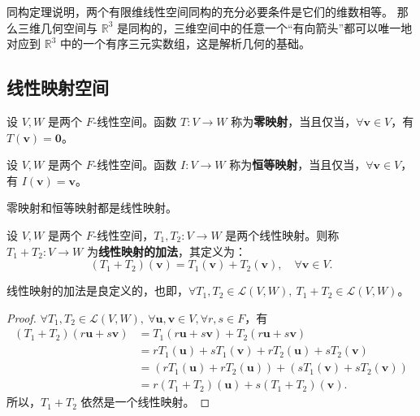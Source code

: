 \begin{note}
    同构定理说明，两个有限维线性空间同构的充分必要条件是它们的维数相等。
    那么三维几何空间与 $\mathbb{R}^3$ 是同构的，三维空间中的任意一个“有向箭头”都可以唯一地对应到 $\mathbb{R}^3$ 中的一个有序三元实数组，这是解析几何的基础。
\end{note}
\vspace{1em}

\subsection{线性映射空间}

\begin{definition}
    设 $V,W$ 是两个 $F$-线性空间。函数 $T:V\to W$ 称为\textbf{零映射}，当且仅当，$\forall \mathbf{v}\in V $，有 $ T(\mathbf{v}) = \mathbf{0} $。
    \label{def:zero_map}
\end{definition}

\begin{definition}
    设 $V,W$ 是两个 $F$-线性空间。函数 $I:V\to W$ 称为\textbf{恒等映射}，当且仅当，$\forall \mathbf{v}\in V $，有 $ I(\mathbf{v}) = \mathbf{v} $。
    \label{def:identity_map}
\end{definition}

\begin{proposition}
    零映射和恒等映射都是线性映射。
\end{proposition}

\begin{definition}[线性映射的加法]
    设 $V,W$ 是两个 $F$-线性空间，$T_1,T_2:V\to W$ 是两个线性映射。则称 $T_1+T_2:V\to W$ 为\textbf{线性映射的加法}，其定义为：
    \[
        (T_1+T_2)(\mathbf{v}) = T_1(\mathbf{v}) + T_2(\mathbf{v}), \quad \forall \mathbf{v}\in V.
    \]
\end{definition}

\begin{proposition}
    线性映射的加法是良定义的，也即，$\forall T_1,T_2\in \mathcal{L}(V,W),\ T_1+T_2\in \mathcal{L}(V,W)$。
\end{proposition}
\begin{proof}
    $\forall T_1,T_2\in \mathcal{L}(V,W),\ \forall \mathbf{u},\mathbf{v}\in V, \forall r,s \in F$，有
    \begin{align*}
        (T_1+T_2)(r\mathbf{u}+s\mathbf{v}) &= T_1(r\mathbf{u}+s\mathbf{v}) + T_2(r\mathbf{u}+s\mathbf{v}) \\
        &= rT_1(\mathbf{u}) + sT_1(\mathbf{v}) + rT_2(\mathbf{u}) + sT_2(\mathbf{v}) \\
        &= (rT_1(\mathbf{u}) + rT_2(\mathbf{u})) + (sT_1(\mathbf{v}) + sT_2(\mathbf{v})) \\
        &= r(T_1+T_2)(\mathbf{u}) + s(T_1+T_2)(\mathbf{v}).
    \end{align*}
    所以，$T_1+T_2$ 依然是一个线性映射。
\end{proof}

